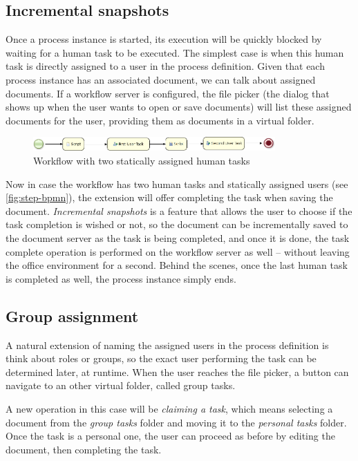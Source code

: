\subsection*{Incremental snapshots}

Once a process instance is started, its execution will be quickly blocked by
waiting for a human task to be executed. The simplest case is when this human
task is directly assigned to a user in the process definition. Given that each
process instance has an associated document, we can talk about assigned
documents. If a workflow server is configured, the file picker (the dialog that
shows up when the user wants to open or save documents) will list these
assigned documents for the user, providing them as documents in a virtual
folder.

\begin{figure}[H]
\centering
\includegraphics[width=350px,keepaspectratio]{step-bpmn.png}
\caption{Workflow with two statically assigned human tasks}
\label{fig:step-bpmn}
\end{figure}

Now in case the workflow has two human tasks and statically assigned users (see
\autoref{fig:step-bpmn}), the extension will offer completing the task when saving the
document. \emph{Incremental snapshots} is a feature that allows the user to
choose if the task completion is wished or not, so the document can be
incrementally saved to the document server as the task is being completed, and
once it is done, the task complete operation is performed on the workflow
server as well -- without leaving the office environment for a second.  Behind
the scenes, once the last human task is completed as well, the process instance
simply ends.

\subsection*{Group assignment}

A natural extension of naming the assigned users in the process definition is
think about roles or groups, so the exact user performing the task can be
determined later, at runtime. When the user reaches the file picker, a button
can navigate to an other virtual folder, called group tasks.

A new operation in this case will be \emph{claiming a task}, which means
selecting a document from the \emph{group tasks} folder and moving it to the
\emph{personal tasks} folder. Once the task is a personal one, the user can
proceed as before by editing the document, then completing the task.

